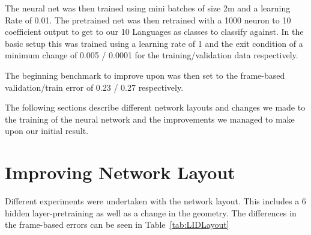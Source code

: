The neural net was then trained using mini batches of size 2m and a learning Rate of 0.01. The pretrained net was then retrained with a 1000 neuron to 10 coefficient output to get to our 10 Languages as classes to classify against. In the basic setup this was trained using a learning rate of 1 and the exit condition of a minimum change of 0.005 / 0.0001 for the training/validation data respectively.

The beginning benchmark to improve upon was then set to the frame-based validation/train error of 0.23 / 0.27 respectively.

The following sections describe different network layouts and changes we made to the training of the neural network and the improvements we managed to make upon our initial result.

\section{Improving Network Layout}
\label{sec:LIDNetwork:Layout}

Different experiments were undertaken with the network layout. This includes a 6 hidden layer-pretraining as well as a change in the geometry. The differences in the frame-based errors can be seen in Table~\ref{tab:LIDLayout}



	